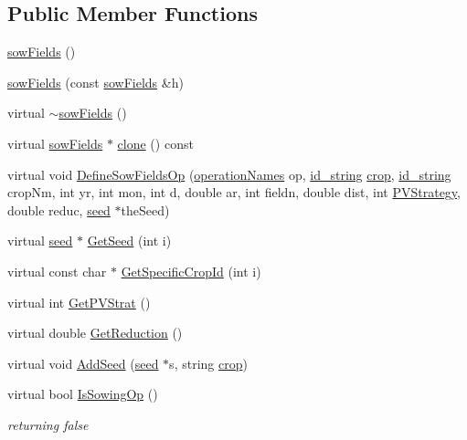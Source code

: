 \subsection*{Public Member Functions}
\begin{DoxyCompactItemize}
\item 
\hyperlink{classsow_fields_a592f7678b68952373a34f62af314e106}{sowFields} ()
\item 
\hyperlink{classsow_fields_aa34fa84a5007d906736a0e46ffe43afd}{sowFields} (const \hyperlink{classsow_fields}{sowFields} \&h)
\item 
virtual \hyperlink{classsow_fields_ad19e5077dfd928f45b9f190ec273736f}{$\sim$sowFields} ()
\item 
virtual \hyperlink{classsow_fields}{sowFields} $\ast$ \hyperlink{classsow_fields_a0feeb92725f01a4e58784ca0d7a7d98e}{clone} () const 
\item 
virtual void \hyperlink{classsow_fields_ac6618566ccb801d5c07a11ea4c216750}{DefineSowFieldsOp} (\hyperlink{operation_names_8h_a77d40de6faa131199a5de6df3d9c7e3d}{operationNames} op, \hyperlink{classfield_operation_fields_a65517d20c09329343461131d07d48ecb}{id\_\-string} \hyperlink{classcrop}{crop}, \hyperlink{classfield_operation_fields_a65517d20c09329343461131d07d48ecb}{id\_\-string} cropNm, int yr, int mon, int d, double ar, int fieldn, double dist, int \hyperlink{classsow_fields_ab43b87025b3e78f3624616754dd98120}{PVStrategy}, double reduc, \hyperlink{classseed}{seed} $\ast$theSeed)
\item 
virtual \hyperlink{classseed}{seed} $\ast$ \hyperlink{classsow_fields_a958ec0bc5d51ebaa5f13c27dcb1d3620}{GetSeed} (int i)
\item 
virtual const char $\ast$ \hyperlink{classsow_fields_a06b3d15e4ff9644953e4e0a39cfb53cc}{GetSpecificCropId} (int i)
\item 
virtual int \hyperlink{classsow_fields_a251cf5b16ca5ac4128918bb47bbf4b0f}{GetPVStrat} ()
\item 
virtual double \hyperlink{classsow_fields_ae5c43a7143c4c4f543a1157c17acb33c}{GetReduction} ()
\item 
virtual void \hyperlink{classsow_fields_afd7b68580aa74038af38793d3578918e}{AddSeed} (\hyperlink{classseed}{seed} $\ast$s, string \hyperlink{classcrop}{crop})
\item 
virtual bool \hyperlink{classsow_fields_ac2784f943d1fc9ffd9f831ed792da834}{IsSowingOp} ()
\begin{DoxyCompactList}\small\item\em returning false \item\end{DoxyCompactList}\item 

\end{DoxyCompactItemize}
